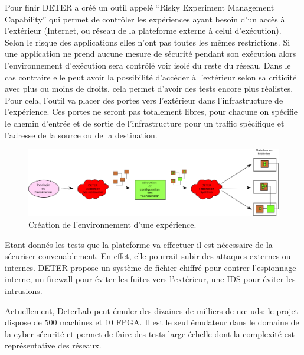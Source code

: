 Pour finir DETER a créé un outil appelé ``Risky Experiment Management
Capability'' qui permet de contrôler les expériences ayant besoin d'un
accès à l'extérieur (Internet, ou réseau de la plateforme externe à
celui d'exécution). Selon le risque des applications elles n'ont pas
toutes les mêmes restrictions. Si une application ne prend aucune
mesure de sécurité pendant son exécution alors l'environnement
d'exécution sera contrôlé voir isolé du reste du réseau. Dans le cas
contraire elle peut avoir la possibilité d'accéder à l'extérieur selon
sa criticité avec plus ou moins de droits, cela permet d'avoir des tests encore plus
réalistes. Pour cela, l'outil va placer des portes vers l'extérieur
dans l'infrastructure de l'expérience. Ces portes ne seront pas
totalement libres, pour chacune on spécifie le chemin d'entrée et de
sortie de l'infrastructure pour un traffic spécifique et l'adresse de
la source ou de la destination.

\begin{figure}
\centering
\includegraphics[scale=0.63]{Pictures/png/Deter_fonctionnement_general}
\caption{Création de l'environnement d'une expérience.}
\label{Deter_fonc}
\end{figure}

Etant donnés les tests que la plateforme va effectuer il est nécessaire de la sécuriser convenablement. En effet, elle pourrait subir des attaques externes ou
internes. DETER propose un système de fichier chiffré pour contrer
l'espionnage interne, un firewall pour éviter les fuites vers
l'extérieur, une IDS pour éviter les intrusions.

 Actuellement, DeterLab peut émuler des dizaines de milliers de n\oe
 uds: le projet dispose de 500 machines et 10 FPGA. Il est le seul
 émulateur dans le domaine de la cyber-sécurité et permet de faire des
 tests large échelle dont la complexité est représentative des
 réseaux.
